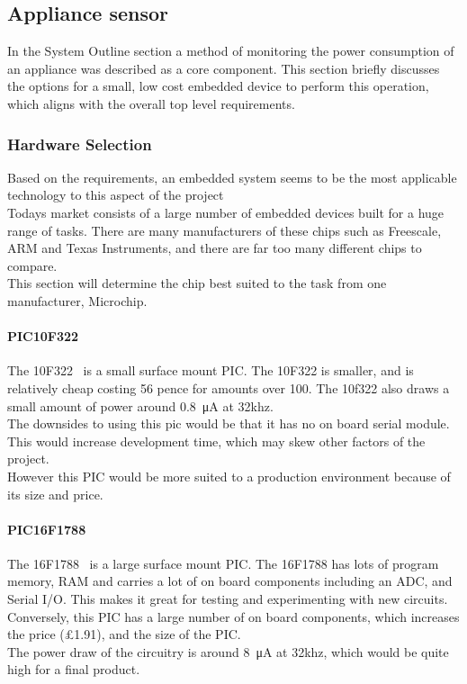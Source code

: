 \documentclass[draft,preprint,12pt,3p]{elsarticle}
\begin{document}
\clearpage
\subsection{Appliance sensor}
In the System Outline section a method of monitoring the power consumption of an appliance was described as a core component. This section briefly discusses the options for a small, low cost embedded device to perform this operation, which aligns with the overall top level requirements.

\subsubsection{Hardware Selection}
Based on the requirements, an embedded system seems to be the most applicable technology to this aspect of the project\\
Todays market consists of a large number of embedded devices built for a huge range of tasks. There are many manufacturers of these chips such as Freescale, ARM and Texas Instruments, and there are far too many different chips to compare.\\
This section will determine the chip best suited to the task from one manufacturer, Microchip.

\paragraph{PIC10F322}
The 10F322~\cite{10f322} is a small surface mount PIC. The 10F322 is smaller, and is relatively cheap costing 56 pence for amounts over 100.
The 10f322 also draws a small amount of power around \SI{0.8}{\micro\ampere} at 32khz.\\
The downsides to using this pic would be that it has no on board serial module. This would increase development time, which may skew other factors of the project.\\
However this PIC would be more suited to a production environment because of its size and price.

\paragraph{PIC16F1788}
The 16F1788~\cite{16f1788} is a large surface mount PIC. The 16F1788 has lots of program memory, RAM  and carries a lot of on board components including an ADC, and Serial I/O. This makes it great for testing and experimenting with new circuits.\\
Conversely, this PIC has a large number of on board components, which increases the price (\pounds1.91),  and the size of the PIC.\\
The power draw of the circuitry is around \SI{8}{\micro\ampere} at 32khz, which would be quite high for a final product.
\end{document}
